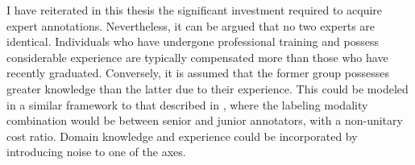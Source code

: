 I have reiterated in this thesis the significant investment required to acquire expert annotations. Nevertheless, it can be argued that no two experts are identical. Individuals who have undergone professional training and possess considerable experience are typically compensated more than those who have recently graduated. Conversely, it is assumed that the former group possesses greater knowledge than the latter due to their experience. This could be modeled in a similar framework to that described in , where the labeling modality combination would be between senior and junior annotators, with a non-unitary cost ratio. Domain knowledge and experience could be incorporated by introducing noise to one of the axes.  
